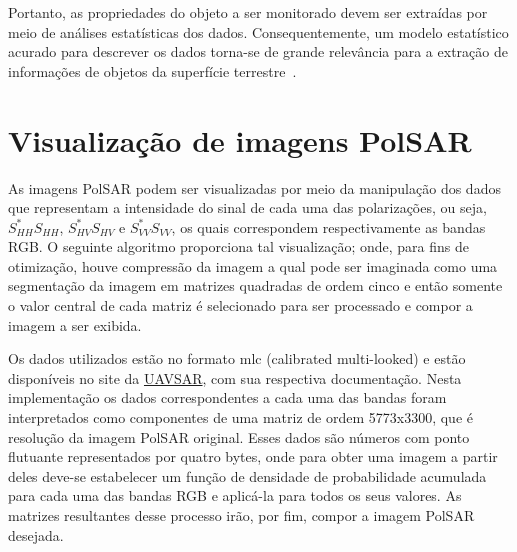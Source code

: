 \documentclass[12pt]{article}
\begin{document}
Portanto, as propriedades do objeto a ser monitorado devem ser extraídas por meio de análises estatísticas dos dados. Consequentemente, um modelo estatístico acurado para descrever os dados torna-se de grande relevância para a extração de informações de objetos da superfície terrestre~\cite{Lee99}.

\newpage

\section{Visualização de imagens PolSAR}
As imagens PolSAR podem ser visualizadas por meio da manipulação dos dados que representam a intensidade do sinal de cada uma das polarizações, ou seja, $S_{HH}^*S_{HH}$, $S_{HV}^*S_{HV}$ e $S_{VV}^*S_{VV}$, os quais correspondem respectivamente as bandas RGB. O seguinte algoritmo proporciona tal visualização; onde, para fins de otimização, houve compressão da imagem a qual pode ser imaginada como uma segmentação da imagem em matrizes quadradas de ordem cinco e então somente o valor central de cada matriz é selecionado para ser processado e compor a imagem a ser exibida. 

Os dados utilizados estão no formato mlc (calibrated multi-looked) e estão disponíveis no site da \href{https://uavsar.jpl.nasa.gov/cgi-bin/product.pl?jobName=trauns_22551_15087_016_150604_L090_CX_01#data}{UAVSAR}, com sua respectiva documentação. Nesta implementação os dados correspondentes a cada uma das bandas foram interpretados como componentes de uma matriz de ordem 5773x3300, que é resolução da imagem PolSAR original. Esses dados são números com ponto flutuante representados por quatro bytes, onde para obter uma imagem a partir deles deve-se estabelecer um função de densidade de probabilidade acumulada para cada uma das bandas RGB e aplicá-la para todos os seus valores. As matrizes resultantes desse processo irão, por fim, compor a imagem PolSAR desejada. 
\end{document}
